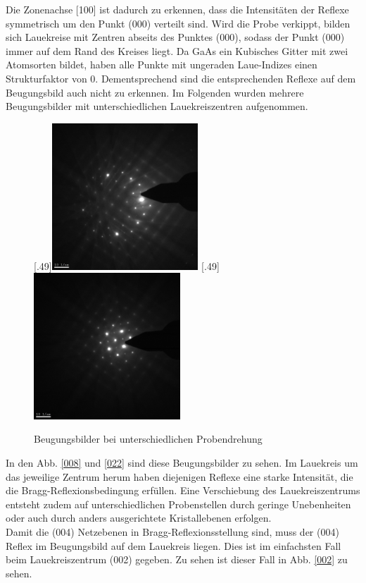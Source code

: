 \documentclass[a4paper,11pt,DIV=11]{scrartcl}
\begin{document}
Die Zonenachse [100] ist dadurch zu erkennen, dass die Intensitäten der Reflexe symmetrisch um den Punkt (000) verteilt sind. Wird die Probe verkippt, bilden sich Lauekreise mit Zentren abseits des Punktes (000), sodass der Punkt (000) immer auf dem Rand des Kreises liegt. Da GaAs ein Kubisches Gitter mit zwei Atomsorten bildet, haben alle Punkte mit ungeraden Laue-Indizes einen Strukturfaktor von 0. Dementsprechend sind die entsprechenden Reflexe auf dem Beugungsbild auch nicht zu erkennen.
Im Folgenden wurden mehrere Beugungsbilder mit unterschiedlichen Lauekreiszentren aufgenommen.

\begin{figure}[htb]\centering
	[.49\linewidth]{\includegraphics[width=0.49\textwidth]{Versuchsdaten/9/008.jpg}}
	[.49\linewidth]{\includegraphics[width=0.49\textwidth]{Versuchsdaten/9/022.jpg}}\\
	\caption{Beugungsbilder bei unterschiedlichen Probendrehung} \label{laue1}
\end{figure}

In den Abb. \ref{008} und \ref{022} sind diese Beugungsbilder zu sehen. Im Lauekreis um das jeweilige Zentrum herum haben diejenigen Reflexe eine starke Intensität, die die Bragg-Reflexionsbedingung erfüllen. Eine Verschiebung des Lauekreiszentrums entsteht zudem auf unterschiedlichen Probenstellen durch geringe Unebenheiten oder auch durch anders ausgerichtete Kristallebenen erfolgen. \\
Damit die (004) Netzebenen in Bragg-Reflexionsstellung sind, muss der (004) Reflex im Beugungsbild auf dem Lauekreis liegen. Dies ist im einfachsten Fall beim Lauekreiszentrum (002) gegeben. Zu sehen ist dieser Fall in Abb. \ref{002} zu sehen.
\end{document}
